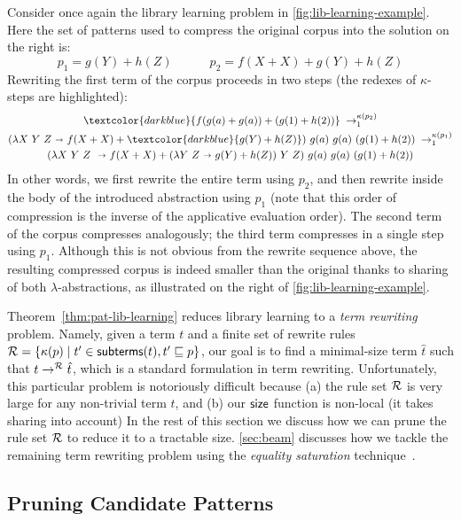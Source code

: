 %
Consider once again the library learning problem in \autoref{fig:lib-learning-example}.
%
Here the set of patterns used to compress the original corpus into the solution on the right is:
\[
  p_1 = g(Y) + h(Z)\quad\quad\quad
  p_2 = f(X + X) + g(Y) + h(Z)
\]
%
Rewriting the first term of the corpus proceeds in two steps (the redexes of $\kappa$-steps are highlighted):
\begin{multline*}
  \textcolor{darkblue}{f(g(a) + g(a)) + (g(1) + h(2))}    \;\rwsteps{\kappa(p_2)}\\     
  (\lambda X\ Y\ Z \bnd f(X + X) + \textcolor{darkblue}{g(Y) + h(Z)})\ g(a)\ g(a)\ (g(1) + h(2))\;\rwsteps{\kappa(p_1)}\\ 
  (\lambda X\ Y\ Z\ \bnd f(X + X) + (\lambda Y\ Z \bnd g(Y) + h(Z))\ Y\ Z)\ g(a)\ g(a)\ (g(1) + h(2))
\end{multline*}
%
In other words, we first rewrite the entire term using $p_2$,
and then rewrite inside the body of the introduced abstraction using $p_1$
(note that this order of compression is the inverse of the applicative evaluation order).
%
The second term of the corpus compresses analogously;
the third term compresses in a single step using $p_1$.
%
Although this is not obvious from the rewrite sequence above,
the resulting compressed corpus is indeed smaller than the original
thanks to sharing of both $\lambda$-abstractions,
as illustrated on the right of \autoref{fig:lib-learning-example}.

%
Theorem~\ref{thm:pat-lib-learning} reduces library learning to a \emph{term rewriting} problem.
%
Namely, given a term $t$ and a finite set of rewrite rules $\mathcal{R} = \{\kappa(p) \mid  t' \in \mathsf{subterms}(t) , t' \sqsubseteq p\}$,
our goal is to find a minimal-size term $\hat{t}$ such that $t \rightarrow^{\mathcal{R}} \hat{t}$,
which is a standard formulation in term rewriting.
%
Unfortunately, this particular problem is notoriously difficult because
(a) the rule set $\mathcal{R}$ is very large for any non-trivial term $t$, and
(b) our $\mathsf{size}$ function is non-local (it takes sharing into account)
%
In the rest of this section we discuss how we can prune the rule set $\mathcal{R}$ 
to reduce it to a tractable size.
%
\autoref{sec:beam} discusses how we tackle the remaining term rewriting problem
using the \emph{equality saturation} technique~\cite{tate2009equality,willsey2021egg}.


\subsection{Pruning Candidate Patterns}
\label{sec:pruning}

